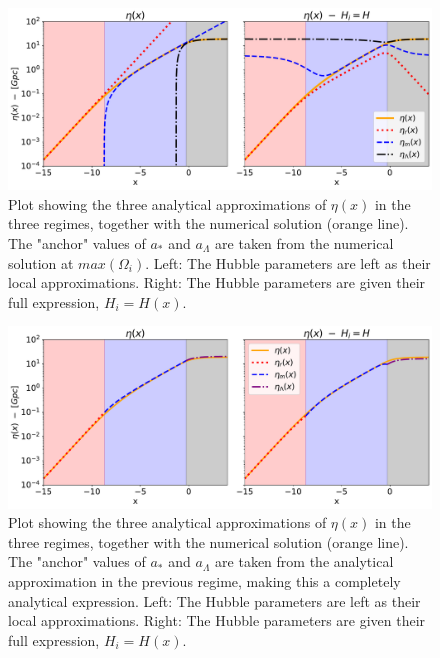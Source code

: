 \documentclass[10pt, a4paper]{article}
\begin{document}
\begin{figure}[H]
    \centering
    \includegraphics[scale=0.5]{../m1_figs/Eta.pdf}
    \caption{Plot showing the three analytical approximations of $\eta(x)$ in the three regimes, together with the numerical solution (orange line). The "anchor" values of $a_*$ and $a_\Lambda$ are taken from the numerical solution at $max(\Omega_i)$. Left: The Hubble parameters are left as their local approximations. Right: The Hubble parameters are given their full expression, $H_i = H(x)$.}
    \label{fig:Eta}
\end{figure}

\begin{figure}[H]
    \centering
    \includegraphics[scale=0.5]{../m1_figs/Eta2.pdf}
    \caption{Plot showing the three analytical approximations of $\eta(x)$ in the three regimes, together with the numerical solution (orange line). The "anchor" values of $a_*$ and $a_\Lambda$ are taken from the analytical approximation in the previous regime, making this a completely analytical expression. Left: The Hubble parameters are left as their local approximations. Right: The Hubble parameters are given their full expression, $H_i = H(x)$.}
    \label{fig:Eta2}
\end{figure}
\end{document}
